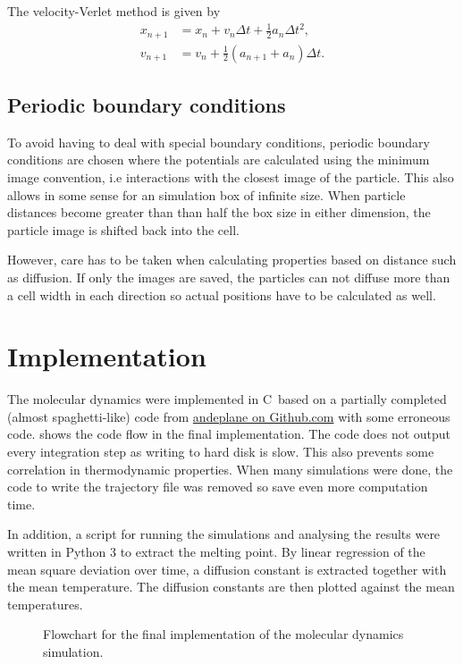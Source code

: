 \documentclass[fleqn]{scrartcl}
\newcommand\cpp{C\nolinebreak[4]\hspace{-.05em}\raisebox{.4ex}{\relsize{-3}{\textbf{++}}}}
\begin{document}
	The velocity-Verlet method is given by
	\begin{align}
		x_{n+1} &= x_n + v_n\Delta t + \frac12 a_n\Delta t^2, \\
		v_{n+1} &= v_n + \frac12\left( a_{n+1} + a_n\right)\Delta t.
	\end{align}
	
	\subsection{Periodic boundary conditions}
	To avoid having to deal with special boundary conditions, periodic boundary conditions are chosen where the potentials are calculated using the minimum image convention, i.e interactions with the closest image of the particle. This also allows in some sense for an simulation box of infinite size. When particle distances become greater than than half the box size in either dimension, the particle image is shifted back into the cell.
	
	However, care has to be taken when calculating properties based on distance such as diffusion. If only the images are saved, the particles can not diffuse more than a cell width in each direction so actual positions have to be calculated as well.
	
	\section{Implementation}
	The molecular dynamics were implemented in \cpp\ based on a partially completed (almost spaghetti-like) code from \href{https://github.com/andeplane/molecular-dynamics-fys3150/tree/b0afed6bd84ecf0230146cc0a808ae6dd0c273e8}{andeplane on Github.com} with some erroneous code.  shows the code flow in the final implementation. The code does not output every integration step as writing to hard disk is slow. This also prevents some correlation in thermodynamic properties. When many simulations were done, the code to write the trajectory file was removed so save even more computation time.
	
	In addition, a script for running the simulations and analysing the results were written in Python 3 to extract the melting point. By linear regression of the mean square deviation over time, a diffusion constant is extracted together with the mean temperature. The diffusion constants are then plotted against the mean temperatures.
	
	\begin{figure}[p]
		\centering
		
		\caption{Flowchart for the final implementation of the molecular dynamics simulation.}
		\label{fig:flowchart}	
	\end{figure}
	
\end{document}
